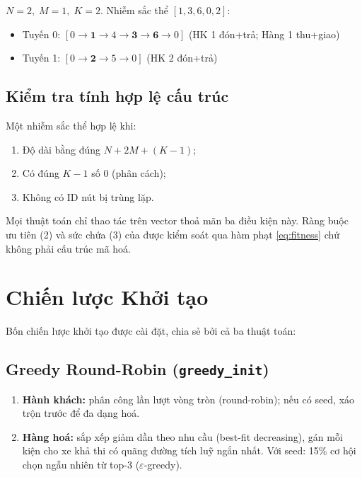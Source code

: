 \documentclass[12pt, a4paper]{article}
\begin{document}
\begin{example*}
  $N=2,\; M=1,\; K=2$. Nhiễm sắc thể $[1, 3, 6, 0, 2]$:
  \begin{itemize}
    \item Tuyến 0: $[0 \to \mathbf{1} \to 4 \to \mathbf{3} \to \mathbf{6} \to 0]$
      \quad (HK 1 đón+trả; Hàng 1 thu+giao)
    \item Tuyến 1: $[0 \to \mathbf{2} \to 5 \to 0]$
      \quad (HK 2 đón+trả)
  \end{itemize}
\end{example*}

\subsection{Kiểm tra tính hợp lệ cấu trúc}

Một nhiễm sắc thể hợp lệ khi:
\begin{enumerate}[noitemsep]
  \item Độ dài bằng đúng $N + 2M + (K-1)$;
  \item Có đúng $K-1$ số $0$ (phân cách);
  \item Không có ID nút bị trùng lặp.
\end{enumerate}

Mọi thuật toán chỉ thao tác trên vector thoả mãn ba điều kiện này. Ràng buộc ưu tiên (2) và sức chứa (3) của  được kiểm soát qua hàm phạt \eqref{eq:fitness} chứ không phải cấu trúc mã hoá.

\section{Chiến lược Khởi tạo}

Bốn chiến lược khởi tạo được cài đặt, chia sẻ bởi cả ba thuật toán:

\subsection{Greedy Round-Robin (\texttt{greedy\_init})}

\begin{enumerate}[noitemsep]
  \item \textbf{Hành khách:} phân công lần lượt vòng tròn (round-robin); nếu có seed, xáo trộn trước để đa dạng hoá.
  \item \textbf{Hàng hoá:} sắp xếp giảm dần theo nhu cầu (best-fit decreasing), gán mỗi kiện cho xe khả thi có quãng đường tích luỹ ngắn nhất. Với seed: 15\% cơ hội chọn ngẫu nhiên từ top-3 ($\varepsilon$-greedy).
\end{enumerate}
\end{document}
